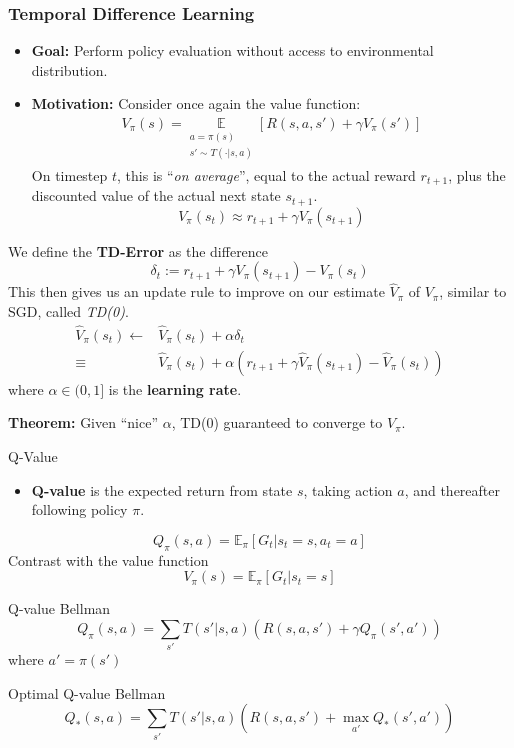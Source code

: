 \documentclass[10pt,a4paper]{beamer}
\begin{document}
\begin{frame}
\frametitle{Temporal Difference Learning}

\begin{itemize}
	\item \textbf{Goal:} Perform policy evaluation without access to environmental
	distribution.
	\pause
	\item \textbf{Motivation:} Consider once again the value function:
	\begin{align*}
		V_\pi(s) = 
		\underset{\substack{a = \pi(s) \\ s' \sim T(\cdot | s, a)}}{\mathbb{E}} \left[ R(s,a,s') + \gamma V_\pi(s') \right] 
	\end{align*}
\pause
	On timestep $t$, this is ``\textit{on average}'', equal to the actual reward $r_{t+1}$, plus the discounted value of the actual next state $s_{t+1}$.
	$$
	V_{\pi}(s_t) \approx r_{t+1} + \gamma V_{\pi}(s_{t+1})
	$$
	\pause
\end{itemize}

We define the \textbf{TD-Error} as the difference 
$$
\delta_t := r_{t+1} + \gamma V_\pi(s_{t+1}) - V_\pi(s_t)
$$
\pause
This then gives us an update rule to improve on our estimate $\hat{V}_\pi$ 
of $V_\pi$,
similar to SGD, called \textit{TD(0)}.
\begin{align*}
\hat{V}_\pi(s_t)  \leftarrow &\hat{V}_\pi(s_t) + \alpha \delta_t  \\
 \equiv &\hat{V}_\pi(s_t) + \alpha \left( r_{t+1} + \gamma \hat{V}_\pi(s_{t+1}) - \hat{V}_\pi(s_t) \right) 
\end{align*}
where $\alpha \in (0,1]$ is the \textbf{learning rate}.

\textbf{Theorem:} Given ``nice'' $\alpha$, 
TD(0) guaranteed to converge to $V_\pi$. 

\end{frame}

\begin{frame}{Q-Value}
	\begin{itemize}
		\item \textbf{Q-value} is the expected return
		from state $s$, taking action $a$, and thereafter following policy $\pi$. 
	\end{itemize}
$$
Q_\pi(s,a)	= \mathbb{E}_\pi [G_t  | s_t =  s, a_t = a]
$$
\pause
Contrast with the value function
$$
V_\pi(s)= \mathbb{E}_\pi [G_t  | s_t =  s]
$$
\pause
\begin{block}{Q-value Bellman}
	$$
	Q_\pi(s,a) = \sum_{s'} T(s' | s, a) \left( R(s,a,s') + \gamma Q_\pi(s', a') \right)
	$$
	where $a' = \pi(s')$
\end{block}
\begin{block}{Optimal Q-value Bellman}
	$$
	Q_*(s,a) = \sum_{s'} T(s' | s, a) \left( R(s,a,s') + \max_{a'} Q_*(s', a') 
	\right)
	$$
\end{block}
\end{frame}
\end{document}
